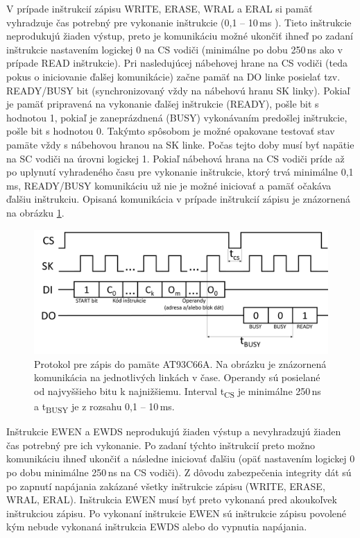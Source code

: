 V prípade inštrukcií zápisu WRITE, ERASE, WRAL a ERAL si pamäť vyhradzuje čas potrebný pre vykonanie inštrukcie (0,1 -- 10\,ms \cite{eepromDatasheet}). Tieto inštrukcie neprodukujú žiaden výstup, preto je komunikáciu možné ukončiť ihneď po zadaní inštrukcie nastavením logickej 0 na CS vodiči (minimálne po dobu 250\,ns ako v prípade READ inštrukcie). Pri nasledujúcej nábehovej hrane na CS vodiči (teda pokus o iniciovanie ďalšej komunikácie) začne pamäť na DO linke posielať tzv. READY/BUSY bit (synchronizovaný vždy na nábehovú hranu SK linky). Pokiaľ je pamäť pripravená na vykonanie ďalšej inštrukcie (READY), pošle bit s hodnotou 1, pokiaľ je zaneprázdnená (BUSY) vykonávaním predošlej inštrukcie, pošle bit s hodnotou 0. Takýmto spôsobom je možné opakovane testovať stav pamäte vždy s nábehovou hranou na SK linke. Počas tejto doby musí byť napätie na SC vodiči na úrovni logickej 1. Pokiaľ nábehová hrana na CS vodiči príde až po uplynutí vyhradeného času pre vykonanie inštrukcie, ktorý trvá minimálne 0,1\,ms, READY/BUSY komunikáciu už nie je možné iniciovať a pamäť očakáva ďalšiu inštrukciu. Opisaná komunikácia v prípade inštrukcií zápisu je znázornená na obrázku \ref{obr:eepromWRITE}.

\begin{figure}[h!]
    \centerline{\includegraphics[width=1\textwidth]{images/eepromWRITE.png}}
    \caption[Protokol pre zápis do pamäte AT93C66A]{Protokol pre zápis do pamäte AT93C66A. Na obrázku je znázornená komunikácia na jednotlivých linkách v čase. Operandy sú posielané od najvyššieho bitu k najnižšiemu. Interval t\textsubscript{CS} je minimálne 250\,ns a t\textsubscript{BUSY} je z rozsahu 0,1 -- 10\,ms.}
    \label{obr:eepromWRITE}
\end{figure}

Inštrukcie EWEN a EWDS neprodukujú žiaden výstup a nevyhradzujú žiaden čas potrebný pre ich vykonanie. Po zadaní týchto inštrukcií preto možno komunikáciu ihneď ukončiť a následne iniciovať ďalšiu (opäť nastavením logickej 0 po dobu minimálne 250\,ns na CS vodiči). Z dôvodu zabezpečenia integrity dát sú po zapnutí napájania zakázané všetky inštrukcie zápisu (WRITE, ERASE, WRAL, ERAL). Inštrukcia EWEN musí byť preto vykonaná pred akoukoľvek inštrukciou zápisu. Po vykonaní inštrukcie EWEN sú inštrukcie zápisu povolené kým nebude vykonaná inštrukcia EWDS alebo do vypnutia napájania.